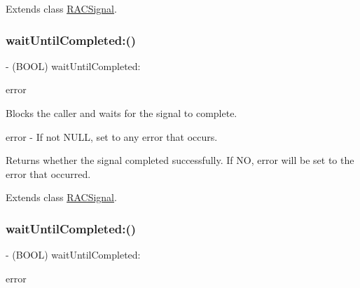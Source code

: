 Extends class \mbox{\hyperlink{interface_r_a_c_signal_af4c476fc335ca830841bd4fd267f05ce}{R\+A\+C\+Signal}}.

\mbox{\label{category_r_a_c_signal_07_operations_08_af4c476fc335ca830841bd4fd267f05ce}} 
\subsubsection{\texorpdfstring{wait\+Until\+Completed\+:()}{waitUntilCompleted:()}\hspace{0.1cm}{\footnotesize\ttfamily [2/3]}}
{\footnotesize\ttfamily -\/ (B\+O\+OL) wait\+Until\+Completed\+: \begin{DoxyParamCaption}\item[{(N\+S\+Error $\ast$$\ast$)}]{error }\end{DoxyParamCaption}}

Blocks the caller and waits for the signal to complete.

error -\/ If not N\+U\+LL, set to any error that occurs.

Returns whether the signal completed successfully. If NO, {\ttfamily error} will be set to the error that occurred. 

Extends class \mbox{\hyperlink{interface_r_a_c_signal_af4c476fc335ca830841bd4fd267f05ce}{R\+A\+C\+Signal}}.

\mbox{\label{category_r_a_c_signal_07_operations_08_af4c476fc335ca830841bd4fd267f05ce}} 
\subsubsection{\texorpdfstring{wait\+Until\+Completed\+:()}{waitUntilCompleted:()}\hspace{0.1cm}{\footnotesize\ttfamily [3/3]}}
{\footnotesize\ttfamily -\/ (B\+O\+OL) wait\+Until\+Completed\+: \begin{DoxyParamCaption}\item[{(N\+S\+Error $\ast$$\ast$)}]{error }\end{DoxyParamCaption}}

